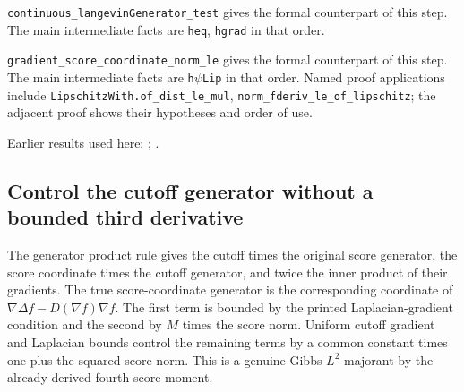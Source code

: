 \documentclass[11pt,a4paper]{report}
\begin{document}
\begin{leanbox}
\texttt{continuous\_\allowbreak{}langevin\allowbreak{}Generator\_\allowbreak{}test} gives the formal counterpart of this step. The main intermediate facts are \texttt{heq}, \texttt{hgrad} in that order.




\texttt{gradient\_\allowbreak{}score\_\allowbreak{}coordinate\_\allowbreak{}norm\_\allowbreak{}le} gives the formal counterpart of this step. The main intermediate facts are \texttt{h\ensuremath{\psi}\allowbreak{}Lip} in that order. Named proof applications include \texttt{Lipschitz\allowbreak{}With.\allowbreak{}of\_\allowbreak{}dist\_\allowbreak{}le\_\allowbreak{}mul}, \texttt{norm\_\allowbreak{}fderiv\_\allowbreak{}le\_\allowbreak{}of\_\allowbreak{}lipschitz}; the adjacent proof shows their hypotheses and order of use.
\end{leanbox}


Earlier results used here: \cite[Section~3.46.14]{LangevinLean2026ULASC}; \cite[Section~3.46.2]{LangevinLean2026ULASC}.
\subsection{\texorpdfstring{Control the cutoff generator without a bounded third derivative}{Control the cutoff generator without a bounded third derivative}}
\label{report-step-AverageLMC-GibbsScoreCutoff-lean-6}


The generator product rule gives the cutoff times the original score generator, the score coordinate times the cutoff generator, and twice the inner product of their gradients. The true score-coordinate generator is the corresponding coordinate of \(\nabla\Delta f-D(\nabla f)\nabla f\). The first term is bounded by the printed Laplacian-gradient condition and the second by \(M\) times the score norm. Uniform cutoff gradient and Laplacian bounds control the remaining terms by a common constant times one plus the squared score norm. This is a genuine Gibbs \(L^{2}\) majorant by the already derived fourth score moment.
\end{document}

